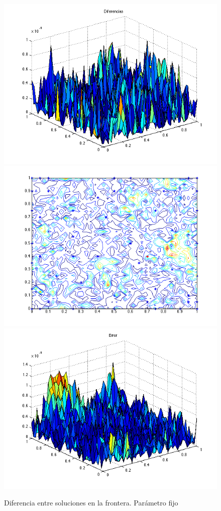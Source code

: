\documentclass[11pt,a4paper]{article}
\begin{document}
\begin{figure}

\includegraphics[scale=.27]{diferencias1.png}
\includegraphics[scale=.27]{centros1.png}
\includegraphics[scale=.27]{error1.png}
\caption{Diferencia entre soluciones en la frontera. Parámetro fijo}
\end{figure}
\end{document}
